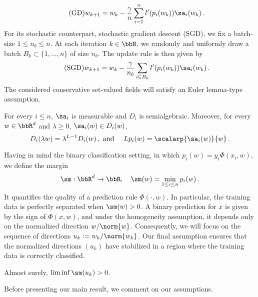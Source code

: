 \begin{equation*}\label{eq:gd_new}\tag{GD}
  w_{k+1} = w_k - \frac{\gamma}{n} \sum_{i=1}^n l'(p_i(w_k))\sa_i(w_k)\,.
\end{equation*}
For its stochastic counterpart, stochastic gradient descent (SGD), we fix a batch-size $1\leq n_b \leq n$. At each iteration $k \in \bbN$, we randomly and uniformly draw a batch $B_k \subset \{1, \ldots, n \}$ of size $n_b$. The update rule is then given by 
\begin{equation*}\label{eq:sgd_new}\tag{SGD}
  w_{k+1} = w_k -  \frac{\gamma}{n_b}\sum_{i\in B_k} l'(p_i(w_k)) \sa_i(w_k)\, .
\end{equation*}
The considered conservative set-valued fields will satisfy an Euler lemma-type assumption.
\begin{assumption}\phantom{=}\label{hyp:conserv}
  For every $i \leq n$, $\sa_i$ is measurable and $D_i$ is semialgebraic. Moreover, for every $w \in \bbR^d$ and $\lambda \geq 0$, $\sa_i(w)  \in D_i(w)$,
  \begin{equation*}
    D_i(\lambda w) = \lambda^{L-1} D_i(w)\, , \textrm{ and } \quad   L p_i(w) = \scalarp{\sa_i(w)}{w}\, .
  \end{equation*}
\end{assumption}
Having in mind the binary classification setting, in which $p_i(w) = y_i \Phi(x_i, w)$, we define the margin
\begin{equation}\label{def:marg}
  \sm: \bbR^d \rightarrow \bbR, \quad \sm(w) = \min_{1\leq i \leq n} p_i(w)\, .
\end{equation}
It quantifies the quality of a prediction rule $\Phi(\cdot, w)$. In particular,  the training data is perfectly separated when $\sm(w) >0$. A binary prediction for $x$ is given by the sign of $\Phi(x, w)$, and under the homogeneity assumption, it depends only on the normalized direction $w / \norm{w}$. Consequently, we will focus on the sequence of directions $u_k := w_k / \norm{w_k}$. Our final assumption ensures that the normalized directions $(u_k)$ have stabilized in a region where the training data is correctly classified.

\begin{assumption}\label{hyp:marg_lowb}
  Almost surely, $\liminf \sm(u_k) >0$.
\end{assumption}
Before presenting our main result, we comment on our assumptions.

